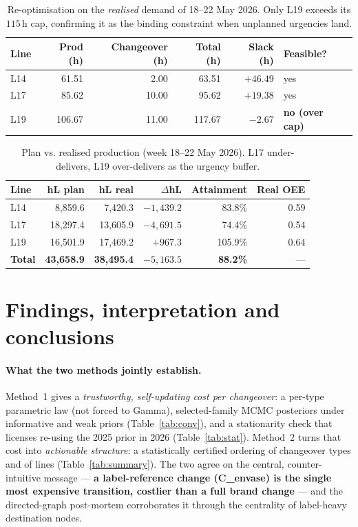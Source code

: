 \documentclass[11pt,a4paper]{article}
\begin{document}
\begin{table}[H]\centering\small
\begin{tabular}{@{}lrrrrl@{}}
\toprule
Line & Prod (h) & Changeover (h) & Total (h) & Slack (h) & Feasible? \\
\midrule
L14 & 61.51 & 2.00  & 63.51  & $+46.49$ & yes \\
L17 & 85.62 & 10.00 & 95.62  & $+19.38$ & yes \\
L19 & 106.67& 11.00 & 117.67 & $-2.67$  & \textbf{no (over cap)} \\
\bottomrule
\end{tabular}
\caption{Re-optimisation on the \emph{realised} demand of 18--22 May 2026. Only
L19 exceeds its $115$\,h cap, confirming it as the binding constraint when
unplanned urgencies land.}
\label{tab:realopt}
\end{table}

\begin{table}[H]\centering\small
\begin{tabular}{@{}lrrrrr@{}}
\toprule
Line & hL plan & hL real & $\Delta$hL & Attainment & Real OEE\\
\midrule
L14 & 8{,}859.6  & 7{,}420.3  & $-1{,}439.2$ & 83.8\% & 0.59 \\
L17 & 18{,}297.4 & 13{,}605.9 & $-4{,}691.5$ & 74.4\% & 0.54 \\
L19 & 16{,}501.9 & 17{,}469.2 & $+967.3$     & 105.9\% & 0.64 \\
\midrule
\textbf{Total} & \textbf{43{,}658.9} & \textbf{38{,}495.4} & $-5{,}163.5$ & \textbf{88.2\%} & ---\\
\bottomrule
\end{tabular}
\caption{Plan vs. realised production (week 18--22 May 2026). L17 under-delivers,
L19 over-delivers as the urgency buffer.}
\label{tab:planreal}
\end{table}

\section{Findings, interpretation and conclusions}\label{sec:findings}
\paragraph{What the two methods jointly establish.}
Method~1 gives a \emph{trustworthy, self-updating cost per changeover}: a per-type
parametric law (not forced to Gamma), selected-family MCMC posteriors under
informative and weak priors (Table~\ref{tab:conv}), and a stationarity check that
licenses re-using the 2025 prior in 2026
(Table~\ref{tab:stat}). Method~2 turns that cost into \emph{actionable structure}:
a statistically certified ordering of changeover types and of lines
(Table~\ref{tab:summary}). The two agree on the central, counter-intuitive message
--- \textbf{a label-reference change (C\_envase) is the single most expensive
transition, costlier than a full brand change} --- and the directed-graph
post-mortem corroborates it through the centrality of label-heavy destination
nodes.
\end{document}
